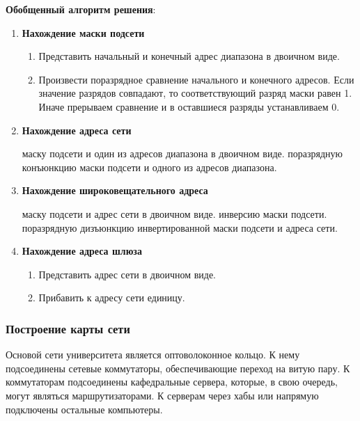 \documentclass[a4paper]{article}
\begin{document}
		\textbf{Обобщенный алгоритм решения}:
		
		\begin{enumerate}
			\item
				\textbf{Нахождение маски подсети}
				\begin{enumerate}
					\item Представить начальный и конечный адрес диапазона в двоичном виде.
					\item Произвести поразрядное сравнение начального и конечного адресов. Если значение разрядов совпадают, то соответствующий разряд маски равен 1. Иначе прерываем сравнение и в оставшиеся разряды устанавливаем 0.
				\end{enumerate}
			\item
				\textbf{Нахождение адреса сети}
				\begin{enumerate}
					 маску подсети и один из адресов диапазона в двоичном виде.
					 поразрядную конъюнкцию маски подсети и одного из адресов диапазона.
				\end{enumerate}

			\item
				\textbf{Нахождение широковещательного адреса}
				\begin{enumerate}
					 маску подсети и адрес сети в двоичном виде.
					 инверсию маски подсети.
					 поразрядную дизъюнкцию инвертированной маски подсети и адреса сети.
				\end{enumerate}

			\item
				\textbf{Нахождение адреса шлюза}
				\begin{enumerate}
					\item Представить адрес сети в двоичном виде.
					\item Прибавить к адресу сети единицу.
				\end{enumerate}
		\end{enumerate}
		
		\subsubsection{Построение карты сети}
		
		Основой сети университета является оптоволоконное кольцо. К нему подсоединены сетевые коммутаторы, обеспечивающие переход на витую пару. К коммутаторам подсоединены кафедральные сервера, которые, в свою очередь, могут являться маршрутизаторами. К серверам через хабы или напрямую подключены остальные компьютеры.
		
\end{document}
